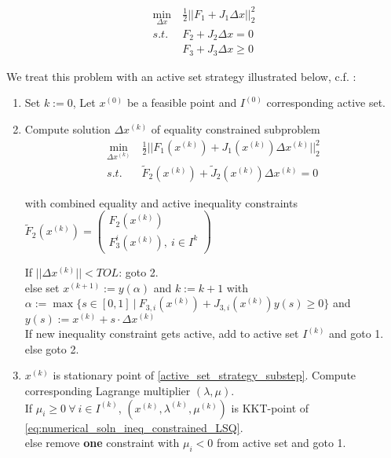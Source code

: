 \documentclass{scrartcl}[12pt, halfparskip]
\numberwithin{equation}{section}
\numberwithin{figure}{section}
\numberwithin{table}{section}
\begin{document}
\begin{align}
\min_{\Delta x} & \ \frac{1}{2} || F_1 + J_1 \Delta x ||_2^2 \label{eq:numerical_soln_ineq_constrained_LSQ} \\
s.t. & \ F_2 + J_2 \Delta x = 0 \nonumber \\
&  \ F_3 + J_3 \Delta x \ge 0 \nonumber
\end{align}

We treat this problem with an active set strategy illustrated below, c.f. \cite{diss_bock}:

\begin{enumerate}
	\item Set $k := 0$, Let $x^{(0)}$ be a feasible point and $I^{(0)}$ corresponding active set.
	\item Compute solution $\Delta x^{(k)}$ of equality constrained subproblem
	\begin{align}
	\min_{\Delta x^{(k)}} & \ \frac{1}{2} || F_1(x^{(k)}) + J_1(x^{(k)}) \Delta x^{(k)} ||_2^2 \nonumber \\
	s.t. & \ \tilde{F}_2(x^{(k)}) + \tilde{J}_2(x^{(k)}) \Delta x^{(k)} = 0
	\label{active_set_strategy_substep}
	\end{align}
	
	with combined equality and active inequality constraints $\tilde{F}_2(x^{(k)}) = 
	\begin{pmatrix} 
	F_2(x^{(k)}) \\  
	F_3^i(x^{(k)}), \ i \in I^k
	\end{pmatrix}$
	
	If $||\Delta x^{(k)}|| < TOL$: goto 2. \\
	else set $x^{(k+1)} := y(\alpha)$ and $k := k+1$ with \\
	$\alpha := \max\{ s \in [0,1] \ | \ F_{3,i}(x^{(k)}) + J_{3,i}(x^{(k)}) y(s) \ge 0 \}$ and \\
	$y(s) := x^{(k)} + s \cdot \Delta x^{(k)}$ \\
	
	If new inequality constraint gets active, add to active set $I^{(k)}$ and goto 1. \\
	else goto 2.
	
	\item $x^{(k)}$ is stationary point of \eqref{active_set_strategy_substep}. Compute corresponding Lagrange multiplier $(\lambda, \mu)$. \\
	If $\mu_i \ge 0 \ \forall \ i \in I^{(k)}$, $(x^{(k)},\lambda^{(k)},\mu^{(k)})$ is KKT-point of \eqref{eq:numerical_soln_ineq_constrained_LSQ}. \\
	else remove \textbf{one} constraint with $\mu_i < 0$ from active set and goto 1.
	
\end{enumerate}
\end{document}

